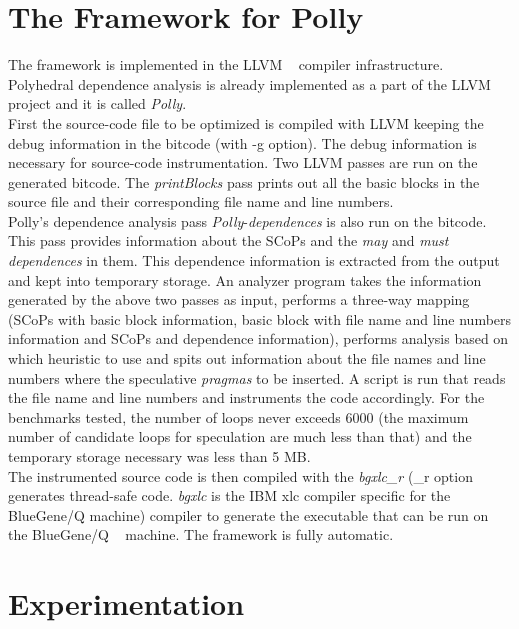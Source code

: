 \documentclass[10pt]{report}          %
\begin{document}
\section{The Framework for Polly}
\label{section:framework}

The framework is implemented in the LLVM ~\cite{llvm} compiler infrastructure. Polyhedral dependence analysis is already implemented as a part of the LLVM project and it is called \textit{Polly}.~\cite{grosserImpact11} \\

First the source-code file to be optimized is compiled with LLVM keeping the debug information in the bitcode (with -g option). The debug information is necessary for source-code instrumentation.  Two LLVM passes are run on the generated bitcode. The \textit{printBlocks} pass prints out all the basic blocks in the source file and their corresponding file name and line numbers.\\

Polly's dependence analysis pass \textit{Polly}-\textit{dependences} is also run on the bitcode.  This pass provides information about the SCoPs and the \textit{may} and \textit{must dependences} in them.  This dependence information is extracted from the output and kept into temporary storage.  An analyzer program takes the information generated by the above two passes as input, performs a three-way mapping (SCoPs with basic block information, basic block with file name and line numbers information and SCoPs and dependence information), performs analysis based on which heuristic to use and spits out information about the file names and line numbers where the speculative \textit{pragmas} to be inserted. A script is run that reads the file name and line numbers and instruments the code accordingly.  For the benchmarks tested, the number of loops never exceeds 6000 (the maximum number of candidate loops for speculation are much less than that) and the temporary storage necessary was less than 5 MB.\\

The instrumented source code is then compiled with the \textit{bgxlc\_r} (\_r option generates thread-safe code. \textit{bgxlc} is the IBM xlc compiler specific for the BlueGene/Q machine) compiler to generate the executable that can be run on the BlueGene/Q ~\cite{BGQ} machine.  The framework is fully automatic.

\section{Experimentation}
\end{document}

